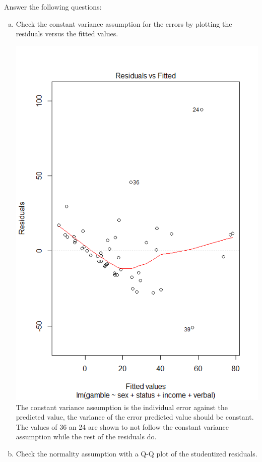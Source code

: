 \documentclass[12pt,letterpaper]{article}
\begin{document}
\vspace{.5cm}
  
\vspace{.5cm}
Answer the following questions:
\vspace{.5cm}
\begin{enumerate}[(a)]
	 \item Check the constant variance assumption for the errors by plotting the residuals versus the fitted values. 
	 
	\includegraphics{PS5a.png}
	The constant variance assumption is the individual error against the predicted value, the variance of the error predicted value should be constant. The values of 36 an 24 are shown to not follow the constant variance assumption while the rest of the residuals do.
	
	\item Check the normality assumption with a Q-Q plot of the studentized residuals.
	

\end{enumerate}
\end{document}

